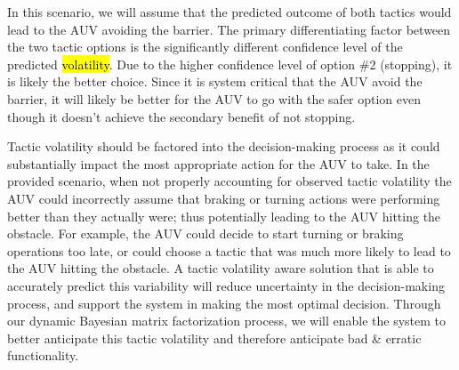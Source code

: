 \documentclass[12pt]{article}
\newcommand{\dan}[1]{\textcolor{blue}{{\it [Dan says: #1]}}}
\begin{document}




In this scenario, we will assume that the predicted outcome of both tactics would lead to the AUV avoiding the barrier. The primary differentiating factor between the two tactic options is the significantly different confidence level of the predicted \hl{volatility}. Due to the higher confidence level of option \#2 (stopping), it is likely the better choice. Since it is system critical that the AUV avoid the barrier, it will likely be better for the AUV to go with the safer option even though it doesn't achieve the secondary benefit of not stopping.










Tactic volatility should be factored into the decision-making process as it could substantially impact the most appropriate action for the AUV to take. In the provided scenario, when not properly accounting for observed tactic volatility the AUV could incorrectly assume that braking or turning actions were performing better than they actually were; thus potentially leading to the AUV hitting the obstacle. For example, the AUV could decide to start turning or braking operations too late, or could choose a tactic that was much more likely to lead to the AUV hitting the obstacle. A tactic volatility aware solution that is able to accurately predict this variability will reduce uncertainty in the decision-making process, and support the system in making the most optimal decision. Through our dynamic Bayesian matrix factorization process, we will enable the system to better anticipate this tactic volatility and therefore anticipate bad \& erratic functionality.
\end{document}

